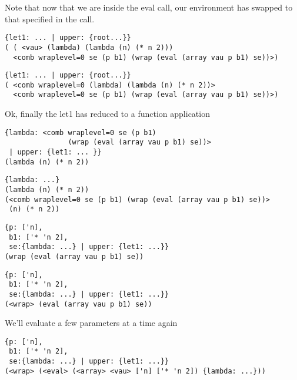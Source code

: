 \documentclass{beamer}
\begin{document}
\begin{frame}[fragile]
Note that now that we are inside the eval call, our environment has swapped
to that specified in the call.
\footnotesize
\begin{verbatim}
{let1: ... | upper: {root...}}
( ( <vau> (lambda) (lambda (n) (* n 2)))
  <comb wraplevel=0 se (p b1) (wrap (eval (array vau p b1) se))>)
\end{verbatim}
\end{frame}

\begin{frame}[fragile]
\footnotesize
\begin{verbatim}
{let1: ... | upper: {root...}}
( <comb wraplevel=0 (lambda) (lambda (n) (* n 2))>
  <comb wraplevel=0 se (p b1) (wrap (eval (array vau p b1) se))>)
\end{verbatim}
Ok, finally the let1 has reduced to a function application
\end{frame}

\begin{frame}[fragile]
\footnotesize
\begin{verbatim}
{lambda: <comb wraplevel=0 se (p b1)
               (wrap (eval (array vau p b1) se))>
 | upper: {let1: ... }}
(lambda (n) (* n 2))
\end{verbatim}
\end{frame}

\begin{frame}[fragile]
\footnotesize
\begin{verbatim}
{lambda: ...}
(lambda (n) (* n 2))
(<comb wraplevel=0 se (p b1) (wrap (eval (array vau p b1) se))>
 (n) (* n 2))
\end{verbatim}
\end{frame}

\begin{frame}[fragile]
\footnotesize
\begin{verbatim}
{p: ['n],
 b1: ['* 'n 2],
 se:{lambda: ...} | upper: {let1: ...}}
(wrap (eval (array vau p b1) se))
\end{verbatim}
\end{frame}

\begin{frame}[fragile]
\footnotesize
\begin{verbatim}
{p: ['n],
 b1: ['* 'n 2],
 se:{lambda: ...} | upper: {let1: ...}}
(<wrap> (eval (array vau p b1) se))
\end{verbatim}
\end{frame}

\begin{frame}[fragile]
We'll evaluate a few parameters at a time again
\footnotesize
\begin{verbatim}
{p: ['n],
 b1: ['* 'n 2],
 se:{lambda: ...} | upper: {let1: ...}}
(<wrap> (<eval> (<array> <vau> ['n] ['* 'n 2]) {lambda: ...}))
\end{verbatim}
\end{frame}
\end{document}

